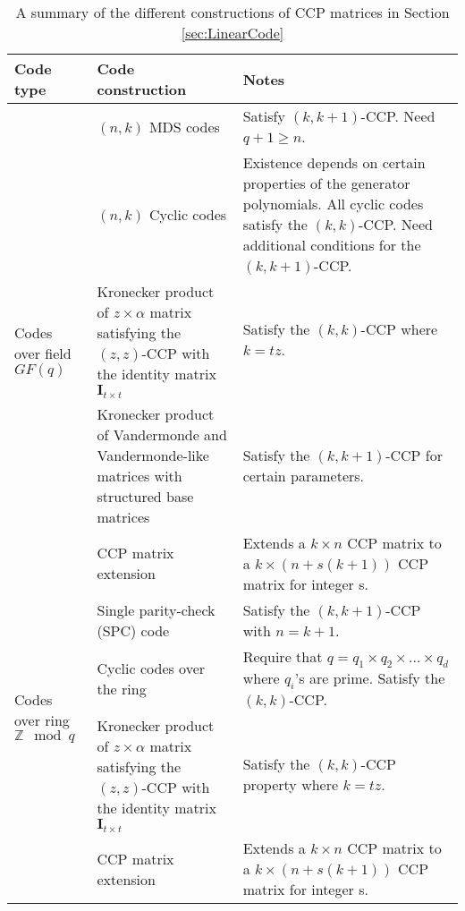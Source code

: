 \documentclass[journal,twocolumn]{IEEEtran}
\theoremstyle{definition}
\newcommand{\bfI}{\mathbf{I}}
\begin{document}
{
	\renewcommand{\arraystretch}{1.5}
	\begin{table*}[t]
	\begin{center}
		\begin{tabular}{|p{3cm}|p{5cm}|p{7cm}|}
			\hline
			\hline
			 {\bf Code type} & {\bf Code construction} & {\bf Notes}  \\
			\hline
			\hline
			\multirow{5}{*}{Codes over field $GF(q)$} & $(n,k)$ MDS codes  & Satisfy $(k,k+1)$-CCP. Need $q+1 \geq n$. \\
			\cline{2-3}
			 & $(n,k)$ Cyclic codes  & Existence depends on certain properties of the generator polynomials. All cyclic codes satisfy the $(k,k)$-CCP. Need additional conditions for the $(k,k+1)$-CCP.  \\
			\cline{2-3}
			  & Kronecker product of $z \times \alpha$ matrix satisfying the $(z,z)$-CCP with the identity matrix $\bfI_{t \times t}$ & Satisfy the $(k,k)$-CCP where $k=tz$.\\
			\cline{2-3}
			 & Kronecker product of Vandermonde and Vandermonde-like matrices with structured base matrices & Satisfy the $(k,k+1)$-CCP for certain parameters.\\
            \cline{2-3}
            & CCP matrix extension & Extends a $k \times n$ CCP matrix to a $k \times (n + s(k+1))$ CCP matrix for integer s.\\
			\hline
			\hline
			\multirow{3}{*}{Codes over ring $\mathbb{Z} \mod q$}  & Single parity-check (SPC) code  & Satisfy the $(k,k+1)$-CCP with $n=k+1$. \\
			\cline{2-3}
			   & Cyclic codes over the ring  & Require that $q = q_1 \times q_2 \times \dots \times q_d$ where $q_i$'s are prime. Satisfy the $(k,k)$-CCP.  \\
			\cline{2-3}
			  & Kronecker product of $z \times \alpha$ matrix satisfying the $(z,z)$-CCP with the identity matrix $\bfI_{t \times t}$ & Satisfy the $(k,k)$-CCP property where $k=tz$.\\
			\cline{2-3}
            & CCP matrix extension & Extends a $k \times n$ CCP matrix to a $k \times (n + s(k+1))$ CCP matrix for integer s.\\
			\hline
			\hline
		\end{tabular}
	\end{center}
	\caption{\label{Table:construction} A summary of the different constructions of CCP matrices in Section \ref{sec:LinearCode}}
\end{table*}
}
\end{document}
